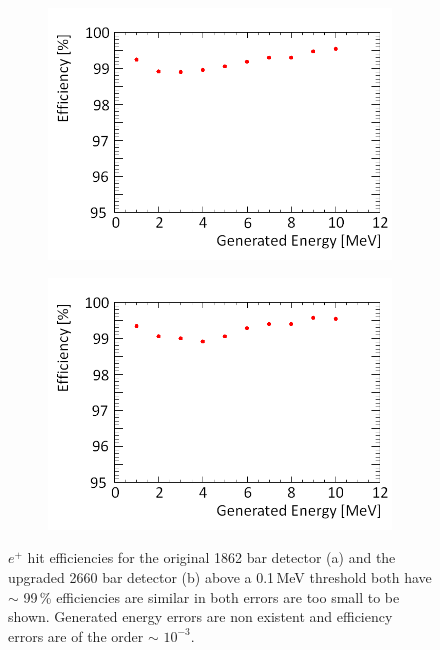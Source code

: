 \begin{figure}[!h]
\centering
\begin{subfigure}{.5\textwidth}
  \centering
  \includegraphics[width=\linewidth]{Chapter4/Figs/Raster/year1Plots/2000_1-10MeV_sec_p_spread_run_medText.png}
  \captionsetup{width=.9\linewidth}
  \caption{}
  \label{subFig:2000_p_sec}
\end{subfigure}%
\begin{subfigure}{.5\textwidth}
  \centering
  \includegraphics[width=\linewidth]{Chapter4/Figs/Raster/year1Plots/3000_1-10MeV_sec_p_spread_run_medText.png}
  \captionsetup{width=.9\linewidth}
  \caption{}
  \label{subFig:3000_p_sec}
\end{subfigure}
\caption{$e^+$ hit efficiencies for the original 1862 bar detector (a) and the upgraded 2660 bar detector (b) above a 0.1\,MeV threshold both have $\sim$ 99\,\% efficiencies are similar in both errors are too small to be shown. Generated energy errors are non existent and efficiency errors are of the order $\sim$ $10^{-3}$. }
\label{fig:2000_3000_p_secs}
\end{figure}

